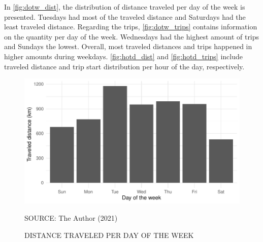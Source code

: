 


In \autoref{fig:dotw_dist}, the distribution of distance traveled per day of the week is presented. Tuesdays had most of the traveled distance and Saturdays had the least traveled distance. Regarding the trips, \autoref{fig:dotw_trips} contains information on the quantity per day of the week. Wednesdays had the highest amount of trips and Sundays the lowest. Overall, most traveled distances and trips happened in higher amounts during weekdays. \autoref{fig:hotd_dist} and \autoref{fig:hotd_trips} include traveled distance and trip start distribution per hour of the day, respectively.  

\begin{figure}[!htbp]
    \centering\footnotesize
    \captionsetup{font=footnotesize}
    \caption{DISTANCE TRAVELED PER DAY OF THE WEEK}
    \includegraphics{fig/dotw_dist.pdf}
    \label{fig:dotw_dist}
    \par SOURCE: The Author (2021)
\end{figure}

